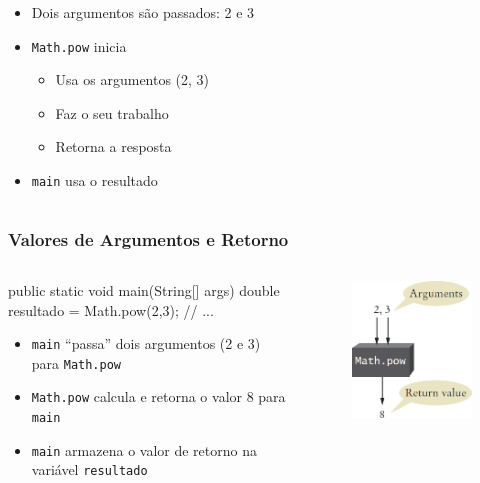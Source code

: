 \documentclass[xcolor={dvipsnames,table},aspectratio=169]{beamer}
\begin{document}
\begin{frame}[fragile]
\begin{columns}[T]
\begin{column}{0.5\linewidth}
\begin{itemize}
\begin{itemize}
				\item Dois argumentos são passados: 2 e 3
				\item \texttt{Math.pow} inicia
				\begin{itemize}
					\item Usa os argumentos (2, 3)
					\item Faz o seu trabalho
					\item Retorna a resposta
				\end{itemize}
				\item \texttt{main} usa o resultado
			\end{itemize}
		\end{itemize}
	\end{column}
\end{columns}
\end{frame}

\begin{frame}[fragile]\frametitle{Valores de Argumentos e Retorno}
\begin{columns}[T]
	\begin{column}{0.5\linewidth}
{\scriptsize
\begin{javacode}
public static void main(String[] args) {
  double resultado = Math.pow(2,3);
  // ...
}
\end{javacode}
}
		\begin{itemize}
			\item \texttt{main} ``passa'' dois argumentos (2 e 3) para \texttt{Math.pow}
			\item \texttt{Math.pow} calcula e retorna o valor 8 para \texttt{main}
			\item \texttt{main} armazena o valor de retorno na variável \texttt{resultado}
		\end{itemize}
	\end{column}
	\begin{column}{0.5\linewidth}
\begin{figure}[h]
	\includegraphics[height=0.5\paperheight,center]{pucrs-ep-fprog-unidade_05-metodos-laminas-argumentos_e_retorno.png}
\end{figure}
	\end{column}
\end{columns}
\end{frame}
\end{document}
